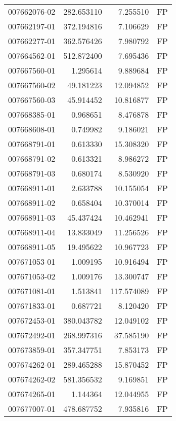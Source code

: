 \begin{tabular}{lrrl}
007662076-02 &  282.653110 &       7.255510 &   FP \\
007662197-01 &  372.194816 &       7.106629 &   FP \\
007662277-01 &  362.576426 &       7.980792 &   FP \\
007664562-01 &  512.872400 &       7.695436 &   FP \\
007667560-01 &    1.295614 &       9.889684 &   FP \\
007667560-02 &   49.181223 &      12.094852 &   FP \\
007667560-03 &   45.914452 &      10.816877 &   FP \\
007668385-01 &    0.968651 &       8.476878 &   FP \\
007668608-01 &    0.749982 &       9.186021 &   FP \\
007668791-01 &    0.613330 &      15.308320 &   FP \\
007668791-02 &    0.613321 &       8.986272 &   FP \\
007668791-03 &    0.680174 &       8.530920 &   FP \\
007668911-01 &    2.633788 &      10.155054 &   FP \\
007668911-02 &    0.658404 &      10.370014 &   FP \\
007668911-03 &   45.437424 &      10.462941 &   FP \\
007668911-04 &   13.833049 &      11.256526 &   FP \\
007668911-05 &   19.495622 &      10.967723 &   FP \\
007671053-01 &    1.009195 &      10.916494 &   FP \\
007671053-02 &    1.009176 &      13.300747 &   FP \\
007671081-01 &    1.513841 &     117.574089 &   FP \\
007671833-01 &    0.687721 &       8.120420 &   FP \\
007672453-01 &  380.043782 &      12.049102 &   FP \\
007672492-01 &  268.997316 &      37.585190 &   FP \\
007673859-01 &  357.347751 &       7.853173 &   FP \\
007674262-01 &  289.465288 &      15.870452 &   FP \\
007674262-02 &  581.356532 &       9.169851 &   FP \\
007674265-01 &    1.144364 &      12.044955 &   FP \\
007677007-01 &  478.687752 &       7.935816 &   FP \\

\end{tabular}
